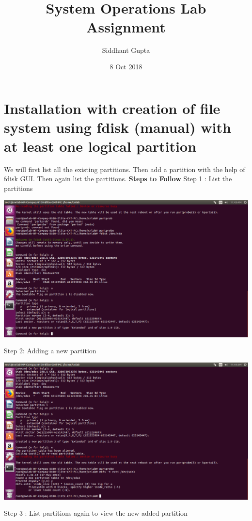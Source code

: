 \documentclass{article}
\title{System Operations Lab Assignment}
\author{Siddhant Gupta }
\date{8 Oct 2018}
\begin{document}
\maketitle

\section{Installation with creation of file system using
fdisk (manual) with at least one logical partition}

We will first list all the existing partitions. Then add a partition with the help of fdisk GUI. Then again list the partitions.
\newline
\newline
\textbf{Steps to Follow} 
\newline
Step 1 : List the partitions
\newline

\begin{center}
\includegraphics[scale=0.2]{partison1.png}
\end{center}
Step 2: Adding a new partition
\newline
\begin{center}
\includegraphics[scale=0.2]{PARTISON2.png}
\end{center}
Step 3 : List partitions again to view the new added partition
\end{document}

